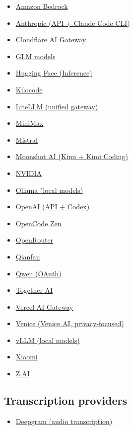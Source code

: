 \begin{itemize}
  \item \href{/providers/bedrock}{Amazon Bedrock}
  \item \href{/providers/anthropic}{Anthropic (API + Claude Code CLI)}
  \item \href{/providers/cloudflare-ai-gateway}{Cloudflare AI Gateway}
  \item \href{/providers/glm}{GLM models}
  \item \href{/providers/huggingface}{Hugging Face (Inference)}
  \item \href{/providers/kilocode}{Kilocode}
  \item \href{/providers/litellm}{LiteLLM (unified gateway)}
  \item \href{/providers/minimax}{MiniMax}
  \item \href{/providers/mistral}{Mistral}
  \item \href{/providers/moonshot}{Moonshot AI (Kimi + Kimi Coding)}
  \item \href{/providers/nvidia}{NVIDIA}
  \item \href{/providers/ollama}{Ollama (local models)}
  \item \href{/providers/openai}{OpenAI (API + Codex)}
  \item \href{/providers/opencode}{OpenCode Zen}
  \item \href{/providers/openrouter}{OpenRouter}
  \item \href{/providers/qianfan}{Qianfan}
  \item \href{/providers/qwen}{Qwen (OAuth)}
  \item \href{/providers/together}{Together AI}
  \item \href{/providers/vercel-ai-gateway}{Vercel AI Gateway}
  \item \href{/providers/venice}{Venice (Venice AI, privacy-focused)}
  \item \href{/providers/vllm}{vLLM (local models)}
  \item \href{/providers/xiaomi}{Xiaomi}
  \item \href{/providers/zai}{Z.AI}
\end{itemize}


\subsection{Transcription providers}


\begin{itemize}
  \item \href{/providers/deepgram}{Deepgram (audio transcription)}
\end{itemize}


